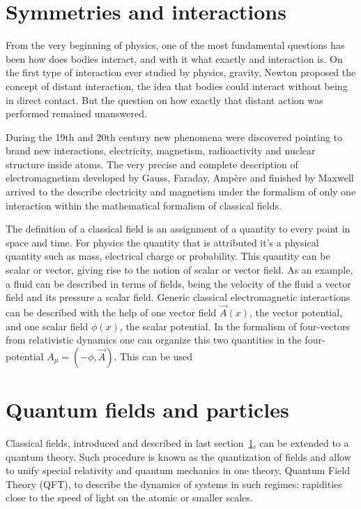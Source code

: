 \section{Symmetries and interactions}
\label{sec:symm}

From the very beginning of physics, one of the most fundamental questions has been how does bodies interact, and with it what exactly and interaction is. On the first type of interaction ever studied by physics, gravity, Newton proposed the concept of distant interaction, the idea that bodies could interact without being in direct contact. But the question on how exactly that distant action was performed remained unanswered. 

During the 19th and 20th century new phenomena were discovered pointing to brand new interactions, electricity, magnetism, radioactivity and nuclear structure inside atoms. The very precise and complete description of electromagnetism developed by Gauss, Faraday, Amp\`{e}re and finished by Maxwell arrived to the describe electricity and magnetism under the formalism of only one interaction within the mathematical formalism of classical fields. 

The definition of a classical field is an assignment of a quantity to every point in space and time. For physics the quantity that is attributed it's a physical quantity such as mass, electrical charge or probability. This quantity can be scalar or vector, giving rise to the notion of scalar or vector field. As an example, a fluid can be described in terms of fields, being the velocity of the fluid a vector field and its pressure a scalar field. Generic classical electromagnetic interactions can be described with the help of one vector field $\vec{A}(x)$, the vector potential, and one scalar field $\phi(x)$, the scalar potential. In the formalism of four-vectors from relativistic dynamics one can organize this two quantities in the four-potential $A_{\mu}=(-\phi,\vec{A})$. This can be used  

\section{Quantum fields and particles}
\label{sec:fields}

Classical fields, introduced and described in last section~\ref{sec:symm}, can be extended to a quantum theory. Such procedure is known as the quantization of fields and allow to unify special relativity and quantum mechanics in one theory, Quantum Field Theory (QFT), to describe the dynamics of systems in such regimes: rapidities close to the speed of light on the atomic or smaller scales. 

